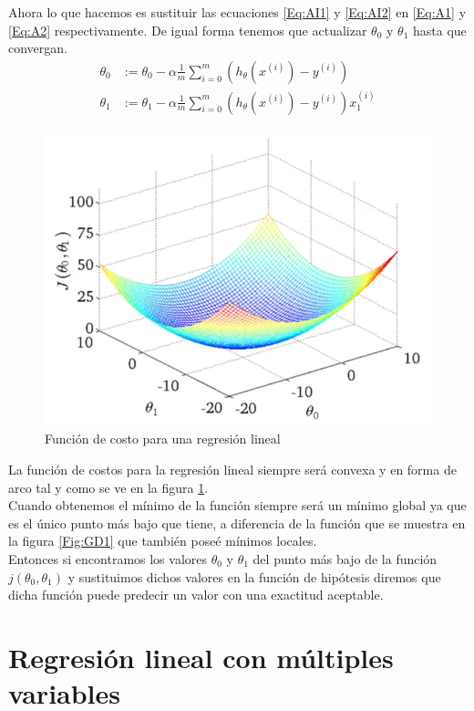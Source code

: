\documentclass{report}
\begin{document}
Ahora lo que hacemos es sustituir las ecuaciones \ref{Eq:AI1} y \ref{Eq:AI2} en \ref{Eq:A1} y \ref{Eq:A2} respectivamente. De igual forma tenemos que actualizar $\theta_0$ y $\theta_1$ hasta que convergan.
\begin{align}
	\theta_0&:=\theta_0-\alpha\frac{1}{m}\sum_{i=0}^{m}(h_\theta(x^{(i)})-y^{(i)})\label{Eq:AI2-1}\\
	\theta_1&:=\theta_1-\alpha\frac{1}{m}\sum_{i=0}^{m}(h_\theta(x^{(i)})-y^{(i)})x_1^{(i)}\label{Eq:AI2-2}\\
\end{align}
\begin{figure}
	\includegraphics[scale=0.31]{img/CF-RL}
	\caption{Función de costo para una regresión lineal}
	\label{Fig:CFRL}
\end{figure}
La función de costos para la regresión lineal siempre será convexa y en forma de arco tal y como se ve en la figura \ref{Fig:CFRL}.\\
Cuando obtenemos el mínimo de la función siempre será un mínimo global ya que es el único punto más bajo que tiene, a diferencia de la función que se muestra en la figura \ref{Fig:GD1} que también poseé mínimos locales.\\Entonces si encontramos los valores $\theta_0$ y $\theta_1$ del punto más bajo de la función $j(\theta_0, \theta_1)$ y sustituimos dichos valores en la función de hipótesis diremos que dicha función puede predecir un valor con una exactitud aceptable. 
\chapter{Regresión lineal con múltiples variables}
\end{document}
